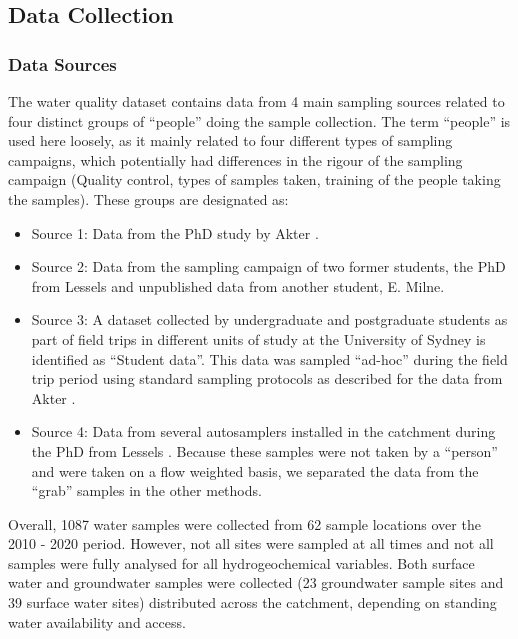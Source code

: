 \documentclass[, manuscript]{copernicus}
\begin{document}
\subsection{Data Collection}

\subsubsection{Data Sources}

The water quality dataset contains data from 4 main sampling sources
related to four distinct groups of ``people'' doing the sample
collection. The term ``people'' is used here loosely, as it mainly
related to four different types of sampling campaigns, which potentially
had differences in the rigour of the sampling campaign (Quality control,
types of samples taken, training of the people taking the samples).
These groups are designated as:

\begin{itemize}
\item
  Source 1: Data from the PhD study by Akter \citeyearpar{Akter2018}.
\item
  Source 2: Data from the sampling campaign of two former students, the
  PhD from Lessels \citeyearpar{Lessels2014} and unpublished data from
  another student, E. Milne.
\item
  Source 3: A dataset collected by undergraduate and postgraduate
  students as part of field trips in different units of study at the
  University of Sydney is identified as ``Student data''. This data was
  sampled ``ad-hoc'' during the field trip period using standard
  sampling protocols as described for the data from Akter
  \citeyearpar{Akter2018}.
\item
  Source 4: Data from several autosamplers installed in the catchment
  during the PhD from Lessels \citeyearpar{Lessels2014}. Because these
  samples were not taken by a ``person'' and were taken on a flow
  weighted basis, we separated the data from the ``grab'' samples in the
  other methods.
\end{itemize}

Overall, 1087 water samples were collected from 62 sample locations over
the 2010 - 2020 period. However, not all sites were sampled at all times
and not all samples were fully analysed for all hydrogeochemical
variables. Both surface water and groundwater samples were collected (23
groundwater sample sites and 39 surface water sites) distributed across
the catchment, depending on standing water availability and access.
\end{document}
